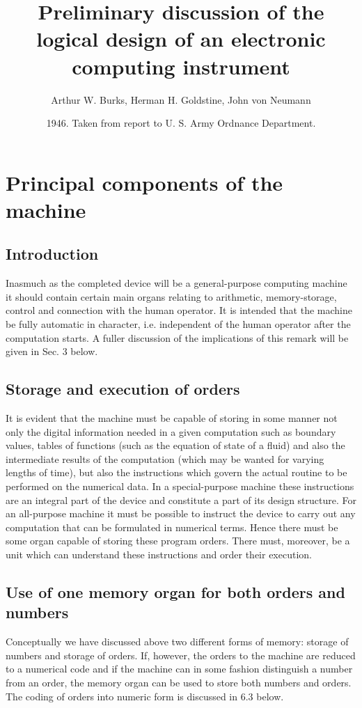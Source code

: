 \documentclass[12pt]{amsart}
\title[The logical design of an electronic computing instrument]{Preliminary discussion of the logical design of an electronic computing instrument}
\author{Arthur W. Burks, Herman H. Goldstine, John von Neumann}
\date{1946. Taken from report to U. S. Army Ordnance Department.}
\begin{document}
\maketitle

\setcounter{tocdepth}{3}
\tableofcontents

\section{Principal components of the machine}

\subsection{Introduction}
Inasmuch as the completed device will be a general-purpose computing machine it should contain certain main organs relating to arithmetic, memory-storage, control and connection with the human operator. It is intended that the machine be fully automatic in character, i.e. independent of the human operator after the computation starts. A fuller discussion of the implications of this remark will be given in Sec. 3 below.

\subsection{Storage and execution of orders}
It is evident that the machine must be capable of storing in some manner not only the digital information needed in a given computation such as boundary values, tables of functions (such as the equation of state of a fluid) and also the intermediate results of the computation (which may be wanted for varying lengths of time), but also the instructions which govern the actual routine to be performed on the numerical data. In a special-purpose machine these instructions are an integral part of the device and constitute a part of its design structure. For an all-purpose machine it must be possible to instruct the device to carry out any computation that can be formulated in numerical terms. Hence there must be some organ capable of storing these program orders. There must, moreover, be a unit which can understand these instructions and order their execution.

\subsection{Use of one memory organ for both orders and numbers}
Conceptually we have discussed above two different forms of memory: storage of numbers and storage of orders. If, however, the orders to the machine are reduced to a numerical code and if the machine can in some fashion distinguish a number from an order, the memory organ can be used to store both numbers and orders. The coding of orders into numeric form is discussed in 6.3 below.
\end{document}
